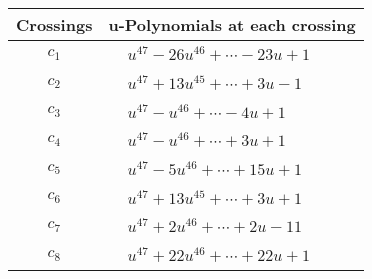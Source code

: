 \documentclass[1p]{elsarticle_modified}
\theoremstyle{definition}
\begin{document}
\begin{tabular}{m{50pt}|m{274pt}}
Crossings & \hspace{64pt}u-Polynomials at each crossing \\
\hline $$\begin{aligned}c_{1}\end{aligned}$$&$\begin{aligned}
&u^{47}-26 u^{46}+\cdots-23 u+1
\end{aligned}$\\
\hline $$\begin{aligned}c_{2}\end{aligned}$$&$\begin{aligned}
&u^{47}+13 u^{45}+\cdots+3 u-1
\end{aligned}$\\
\hline $$\begin{aligned}c_{3}\end{aligned}$$&$\begin{aligned}
&u^{47}- u^{46}+\cdots-4 u+1
\end{aligned}$\\
\hline $$\begin{aligned}c_{4}\end{aligned}$$&$\begin{aligned}
&u^{47}- u^{46}+\cdots+3 u+1
\end{aligned}$\\
\hline $$\begin{aligned}c_{5}\end{aligned}$$&$\begin{aligned}
&u^{47}-5 u^{46}+\cdots+15 u+1
\end{aligned}$\\
\hline $$\begin{aligned}c_{6}\end{aligned}$$&$\begin{aligned}
&u^{47}+13 u^{45}+\cdots+3 u+1
\end{aligned}$\\
\hline $$\begin{aligned}c_{7}\end{aligned}$$&$\begin{aligned}
&u^{47}+2 u^{46}+\cdots+2 u-11
\end{aligned}$\\
\hline $$\begin{aligned}c_{8}\end{aligned}$$&$\begin{aligned}
&u^{47}+22 u^{46}+\cdots+22 u+1
\end{aligned}$\\

\end{tabular}
\end{document}
